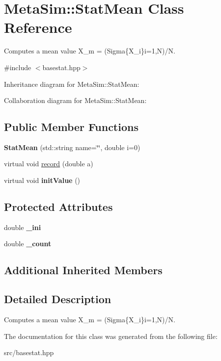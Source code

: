 \hypertarget{classMetaSim_1_1StatMean}{}\section{Meta\+Sim\+:\+:Stat\+Mean Class Reference}
\label{classMetaSim_1_1StatMean}


Computes a mean value X\+\_\+m = (Sigma\{X\+\_\+i\}i=1,N)/N.  




{\ttfamily \#include $<$basestat.\+hpp$>$}



Inheritance diagram for Meta\+Sim\+:\+:Stat\+Mean\+:


Collaboration diagram for Meta\+Sim\+:\+:Stat\+Mean\+:
\subsection*{Public Member Functions}
\begin{DoxyCompactItemize}
\item 
{\bfseries Stat\+Mean} (std\+::string name=\char`\"{}\char`\"{}, double i=0)
\item 
virtual void \hyperlink{group__metasim__stat_ga7acbee135dc23bc73135594b3bb03476}{record} (double a)
\item 
virtual void {\bfseries init\+Value} ()
\end{DoxyCompactItemize}
\subsection*{Protected Attributes}
\begin{DoxyCompactItemize}
\item 
double {\bfseries \+\_\+ini}
\item 
double {\bfseries \+\_\+count}
\end{DoxyCompactItemize}
\subsection*{Additional Inherited Members}


\subsection{Detailed Description}
Computes a mean value X\+\_\+m = (Sigma\{X\+\_\+i\}i=1,N)/N. 

The documentation for this class was generated from the following file\+:\begin{DoxyCompactItemize}
\item 
src/basestat.\+hpp\end{DoxyCompactItemize}
